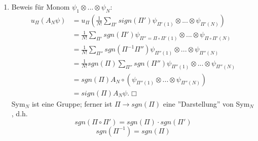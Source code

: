 \documentclass[twoside,a4paper]{scrartcl}
\renewcommand{\1}{\mathds{1}}
\newcommand{\ra}{\rightarrow}
\begin{document}
{\begin{enumerate}
$$=\psi_1\cdot\begin{pmatrix} 1 \\ 0 \end{pmatrix}+\psi_2 \cdot\begin{pmatrix} 0 \\ 1 \end{pmatrix} $$
$\begin{pmatrix} 1 \\ 0 \end{pmatrix}$, $\begin{pmatrix} 0 \\ 1 \end{pmatrix}$ ist eine Basis in $\mathbb C^2$\\
Mit dem Isomorphismus auf den Basisvektoren:
$$\psi_1\begin{pmatrix} 1 \\ 0 \end{pmatrix}+\psi_2\begin{pmatrix} 0 \\ 1 \end{pmatrix} \mapsto \psi_1 \otimes\begin{pmatrix} 1 \\ 0 \end{pmatrix}+\psi_2\otimes \begin{pmatrix} 0 \\ 1 \end{pmatrix}$$
gilt $\psi \in L^2(\mathbb R^3) \otimes \mathbb C^2$ und damit $L^2(\mathbb R^3) \oplus L^2(\mathbb R^3) \cong L^2(\mathbb R^3) \otimes \mathbb C^2$
\item 
Beweis für Monom $\psi_{1} \otimes ... \otimes \psi_{N}$:
\begin{align}
u_\Pi(A_N\psi)&= u_\Pi (\frac{1}{N!} \sum_{\Pi'} sign(\Pi') \psi_{\Pi'(1)} \otimes ... \otimes \psi_{\Pi'(N)})\\
&=\frac{1}{N!} \sum_{\Pi'} sgn(\Pi') \psi_{\Pi''=\Pi \circ \Pi'(1)} \otimes ... \otimes \psi_{\Pi \circ \Pi'(N)} \\
&=\frac{1}{N!} \sum_{\Pi''} sgn(\Pi^{-1}\Pi'') \psi_{\Pi''(1)} \otimes ... \otimes \psi_{\Pi''(N)} \\
&=\frac{1}{N!}  sgn(\Pi) \sum_{\Pi''} sgn(\Pi'') \psi_{\Pi''(1)} \otimes ... \otimes \psi_{\Pi''(N)} \\
&=sgn(\Pi) A_N \circ (\psi_{\Pi''(1)} \otimes ... \otimes \psi_{\Pi''(N)})\\
&=sign(\Pi) A_N \psi. \Box
\end{align}
Sym$_N$ ist eine Gruppe; ferner ist $\Pi \ra sgn(\Pi)$ eine ''Darstellung'' von Sym$_N$, d.h. 
$$sgn(\Pi \circ \Pi')= sgn(\Pi)\cdot sgn(\Pi')$$
$$sgn(\Pi^{-1})=sgn(\Pi)$$
\end{enumerate}
}{}
\end{document}
